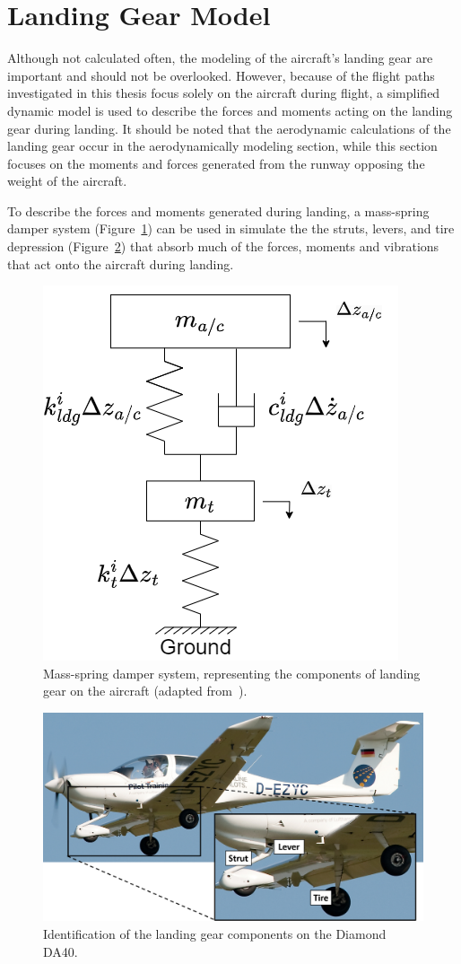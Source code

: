 \section{\textbf{Landing Gear Model}}
Although not calculated often, the modeling of the aircraft's landing gear are important and should not be overlooked. However, because of the flight paths investigated in this thesis focus solely on the aircraft during flight, a simplified dynamic model is used to describe the forces and moments acting on the landing gear during landing. It should be noted that the aerodynamic calculations of the landing gear occur in the aerodynamically modeling section, while this section focuses on the moments and forces generated from the runway opposing the weight of the aircraft.

To describe the forces and moments generated during landing, a mass-spring damper system (Figure~\ref{fig:ldgfbd}) can be used in simulate the the struts, levers, and tire depression (Figure~\ref{fig:ldg}) that absorb much of the forces, moments and vibrations that act onto the aircraft during landing.

\begin{figure}[!ht]
    \centering
    \includegraphics[width=.4\linewidth]{Figures/ldgfbd.drawio.png}
    \caption{Mass-spring damper system, representing the components of landing gear on the aircraft (adapted from~\cite{xingStrengthAnalysisDiagonal2012}).}\label{fig:ldgfbd}
\end{figure}

\begin{figure}[!ht]
    \centering
    \includegraphics[width=.75\linewidth]{Figures/LandingGear.png}
    \caption{Identification of the landing gear components on the Diamond DA40.}\label{fig:ldg}
\end{figure}

